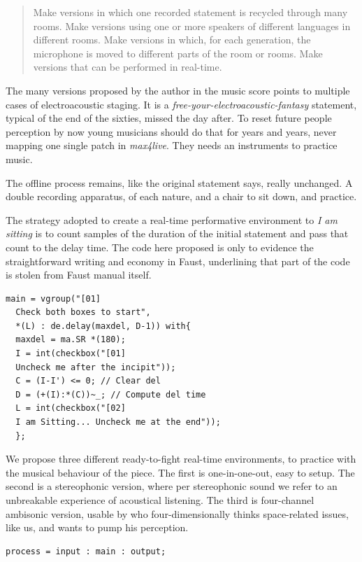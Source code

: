 \documentclass[twoside,a4paper]{article}
\begin{document}
\begin{quote}
Make versions in which one recorded statement is recycled through many rooms. Make versions using one or more speakers of different languages in different rooms. Make versions in which, for each generation, the microphone is moved to different parts of the room or rooms. Make versions that can be performed in real-time. 
\end{quote}

The many versions proposed by the author in the music score points to multiple cases of electroacoustic staging. It is a \emph{free-your-electroacoustic-fantasy} statement, typical of the end of the sixties, missed the day after. To reset future people perception by now young musicians should do that for years and years, never mapping one single patch in \emph{max4live}. They needs an instruments to practice music. 

The offline process remains, like the original statement says, really unchanged. A double recording apparatus, of each nature, and a chair to sit down, and practice. 

The strategy adopted to create a real-time performative environment to \emph{I am sitting} is to count samples of the duration of the initial statement and pass that count to the delay time. The code here proposed is only to evidence the straightforward writing and economy in Faust, underlining that part of the code is stolen from Faust manual itself. 

\begin{lstlisting}
main = vgroup("[01]
  Check both boxes to start",
  *(L) : de.delay(maxdel, D-1)) with{
  maxdel = ma.SR *(180);
  I = int(checkbox("[01]
  Uncheck me after the incipit"));
  C = (I-I') <= 0; // Clear del
  D = (+(I):*(C))~_; // Compute del time
  L = int(checkbox("[02]
  I am Sitting... Uncheck me at the end"));
  };
\end{lstlisting}

We propose three different ready-to-fight real-time environments, to practice with the musical behaviour of the piece. The first is one-in-one-out, easy to setup. The second is a stereophonic version, where per stereophonic sound we refer to an unbreakable experience of acoustical listening. The third is four-channel ambisonic version, usable by who four-dimensionally thinks space-related issues, like us, and wants to pump his perception. 

\begin{lstlisting}
process = input : main : output;
\end{lstlisting}
\end{document}
